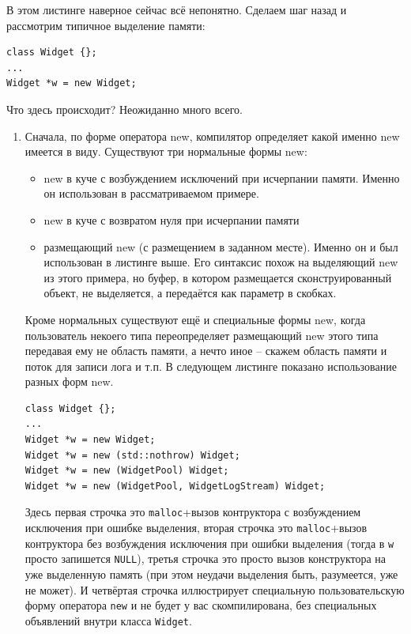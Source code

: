 \documentclass[a4paper,12pt,oneside]{article}
\begin{document}


В этом листинге наверное сейчас всё непонятно. Сделаем шаг назад и рассмотрим типичное выделение памяти:

\begin{lstlisting}
class Widget {};
...
Widget *w = new Widget;
\end{lstlisting}

Что здесь происходит? Неожиданно много всего.

\begin{enumerate}
\item
Сначала, по форме оператора new, компилятор определяет какой именно new имеется в виду. Существуют три нормальные формы new:
\begin{itemize}
\item
new в куче с возбуждением исключений при исчерпании памяти. Именно он использован в рассматриваемом примере.
\item
new в куче с возвратом нуля при исчерпании памяти
\item
размещающий new (с размещением в заданном месте). Именно он и был использован в листинге выше. Его синтаксис похож на выделяющий new из этого примера, но буфер, в котором размещается сконструированный объект, не выделяется, а передаётся как параметр в скобках.
\end{itemize}

Кроме нормальных существуют ещё и специальные формы new, когда пользователь некоего типа переопределяет размещающий new этого типа передавая ему не область памяти, а нечто иное -- скажем область памяти и поток для записи лога и т.п. В следующем листинге показано использование разных форм new.

\begin{lstlisting}
class Widget {};
...
Widget *w = new Widget;
Widget *w = new (std::nothrow) Widget;
Widget *w = new (WidgetPool) Widget;
Widget *w = new (WidgetPool, WidgetLogStream) Widget;
\end{lstlisting}

Здесь первая строчка это \lstinline!malloc!+вызов контруктора с возбуждением исключения при ошибке выделения, вторая строчка это \lstinline!malloc!+вызов контруктора без возбуждения исключения при ошибки выделения (тогда в \lstinline!w! просто запишется \lstinline!NULL!), третья строчка это просто вызов конструктора на уже выделенную память (при этом неудачи выделения быть, разумеется, уже не может). И четвёртая строчка иллюстрирует специальную пользовательскую форму оператора \lstinline!new! и не будет у вас скомпилирована, без специальных объявлений внутри класса \lstinline!Widget!.


\end{enumerate}
\end{document}
